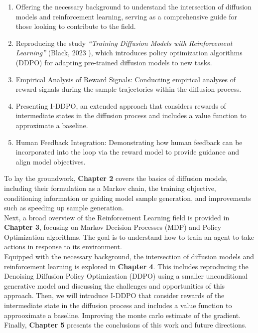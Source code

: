 \begin{enumerate}
    \item Offering the necessary background to understand the intersection of diffusion models and reinforcement learning, serving as a comprehensive guide for those looking to contribute to the field.
    \item Reproducing the study \textit{``Training Diffusion Models with Reinforcement Learning''} (Black, 2023 \cite{black2023training}), which introduces policy optimization algorithms (DDPO) for adapting pre-trained diffusion models to new tasks.
    \item Empirical Analysis of Reward Signals: Conducting empirical analyses of reward signals during the sample trajectories within the diffusion process.
    \item Presenting I-DDPO, an extended approach that considers rewards of intermediate states in the diffusion process and includes a value function to approximate a baseline.
    \item Human Feedback Integration: Demonstrating how human feedback can be incorporated into the loop via the reward model to provide guidance and align model objectives.
\end{enumerate}

\noindent To lay the groundwork, \textbf{Chapter 2} covers the basics of diffusion models, including their formulation as a Markov chain, the training objective, conditioning information or guiding model sample generation, and improvements such as speeding up sample generation. \\

\noindent Next, a broad overview of the Reinforcement Learning field is provided in \textbf{Chapter 3}, focusing on Markov Decision Processes (MDP) and Policy Optimization algorithms. The goal is to understand how to train an agent to take actions in response to its environment. \\

\noindent Equipped with the necessary background, the intersection of diffusion models and reinforcement learning is explored in \textbf{Chapter 4}. This includes reproducing the Denoising Diffusion Policy Optimization (DDPO) \cite{black2023training} using a smaller unconditional generative model and discussing the challenges and opportunities of this approach. Then, we will introduce I-DDPO that consider rewards of the intermediate state in the diffusion process and includes a value function to approoximate a baseline. Improving the monte carlo estimate of the gradient. \\

\noindent Finally, \textbf{Chapter 5} presents the conclusions of this work and future directions. \\
